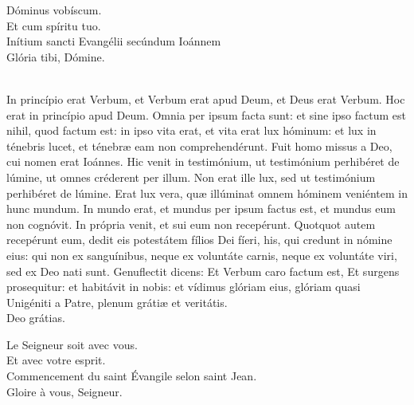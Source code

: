 \documentclass[twoside]{article}
\begin{document}
\begin{paracol}{2}

\vv Dóminus vobíscum.\\
\rr Et cum spíritu tuo.\\
\vv Inítium \cc sancti Evangélii secúndum Ioánnem\\
\rr Glória tibi, Dómine.

\\
In princípio erat Verbum, et Verbum erat apud Deum, et Deus erat Verbum. Hoc erat in princípio apud Deum. Omnia per ipsum facta sunt: et sine ipso factum est nihil, quod factum est: in ipso vita erat, et vita erat lux hóminum: et lux in ténebris lucet, et ténebræ eam non comprehendérunt.
Fuit homo missus a Deo, cui nomen erat Ioánnes. Hic venit in testimónium, ut testimónium perhibéret de lúmine, ut omnes créderent per illum. Non erat ille lux, sed ut testimónium perhibéret de lúmine.
Erat lux vera, quæ illúminat omnem hóminem veniéntem in hunc mundum. In mundo erat, et mundus per ipsum factus est, et mundus eum non cognóvit. In própria venit, et sui eum non recepérunt. Quotquot autem recepérunt eum, dedit eis potestátem fílios Dei fíeri, his, qui credunt in nómine eius: qui non ex sanguínibus, neque ex voluntáte carnis, neque ex voluntáte viri, sed ex Deo nati sunt. Genuflectit dicens: Et Verbum caro factum est, Et surgens prosequitur: et habitávit in nobis: et vídimus glóriam eius, glóriam quasi Unigéniti a Patre, plenum grátiæ et
veritátis.\\
\rr Deo grátias.

\switchcolumn

\vv Le Seigneur soit avec vous.\\
\rr Et avec votre esprit.\\
\vv Commencement du saint Évangile selon saint Jean.\\
\rr Gloire à vous, Seigneur.\\


\end{paracol}
\end{document}
